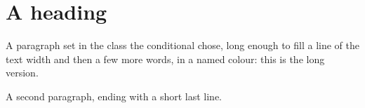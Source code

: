 \documentclass{amsart}
\newcommand\variant{the long version}
\begin{document}
\section{A heading}
A paragraph set in the class the conditional chose, long enough to fill a
line of the text width and then a few more words, \textcolor{OliveGreen}{in a
named colour}: this is \variant.

A second paragraph, ending with a short last line.
\end{document}
